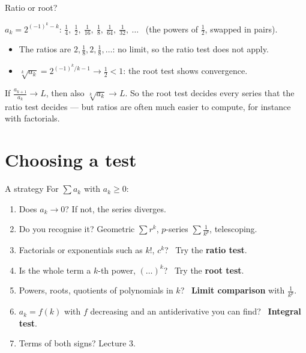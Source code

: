 \documentclass{wosm-slides}
\begin{document}
\begin{frame}{Ratio or root?}
  \begin{example}
    $a_k = 2^{(-1)^k - k}$: \quad
    $\frac14,\ \frac12,\ \frac1{16},\ \frac18,\ \frac1{64},\ \frac1{32},\ \dots$
    \ (the powers of $\frac12$, swapped in pairs).
    \begin{itemize}
      \item The ratios are $2, \frac18, 2, \frac18, \dots$: no limit, so the ratio test
        does not apply.
      \item $\sqrt[k]{a_k} = 2^{(-1)^k/k - 1} \to \frac12 < 1$: the root test shows
        convergence.
    \end{itemize}
  \end{example}
  \pause
  \begin{remark}
    If $\frac{a_{k+1}}{a_k} \to L$, then also $\sqrt[k]{a_k} \to L$. So the root test
    decides every series that the ratio test decides --- but ratios are often much easier
    to compute, for instance with factorials.
  \end{remark}
\end{frame}

\section{Choosing a test}

\begin{frame}{A strategy}
  For $\sum a_k$ with $a_k \ge 0$:
  \begin{enumerate}
    \item Does $a_k \to 0$? If not, the series diverges.
    \item Do you recognise it? Geometric $\sum r^k$, $p$-series $\sum \frac{1}{k^p}$,
      telescoping.
    \item Factorials or exponentials such as $k!$, $c^k$? \ Try the \textbf{ratio test}.
    \item Is the whole term a $k$-th power, $(\ldots)^k$? \ Try the \textbf{root test}.
    \item Powers, roots, quotients of polynomials in $k$? \
      \textbf{Limit comparison} with $\frac{1}{k^p}$.
    \item $a_k = f(k)$ with $f$ decreasing and an antiderivative you can find? \
      \textbf{Integral test}.
    \item Terms of both signs? Lecture 3.
  \end{enumerate}
\end{frame}
\end{document}

